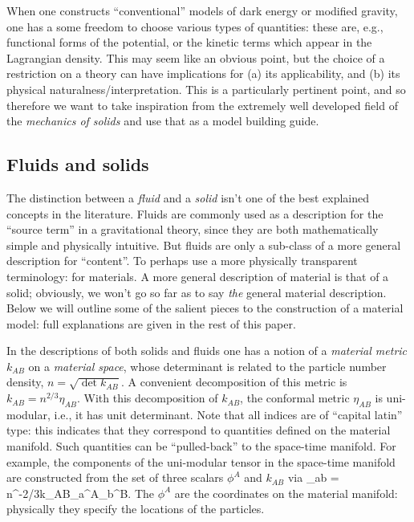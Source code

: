 When one constructs ``conventional'' models of dark energy or modified gravity, one has a some freedom to choose various types of quantities: these are, e.g., functional forms of the potential, or the kinetic terms which appear in the Lagrangian density. This may seem like an obvious point, but the choice of a restriction on a theory can have implications for (a) its applicability, and (b) its physical naturalness/interpretation. This is a particularly pertinent point, and so therefore we want to take inspiration from the extremely well developed field of the \textit{mechanics of solids} and use that as a model building guide.


\subsection{Fluids and solids}
The distinction between a \textit{fluid} and a \textit{solid} isn't one of the best explained concepts in the literature. Fluids are commonly used as a description for the ``source term'' in a gravitational theory, since they are both mathematically simple and physically intuitive. But fluids are only a sub-class of a more general description for ``content''. To perhaps use a  more physically transparent terminology: for materials. A more general  description of material is that of a solid; obviously, we won't go so far as to say \textit{the}  general material description. Below we will outline some of the salient pieces to the construction of a material model: full explanations are given in the rest of this paper.

In the descriptions of both solids and fluids  one has a notion of a \textit{material metric} $k_{AB}$ on a \textit{material space}, whose determinant is related to the particle number density, $n = \sqrt{\det k_{AB}}$. A convenient decomposition of this metric is $k_{AB} = n^{2/3}\eta_{AB}$. With this decomposition of   $k_{AB}$, the conformal metric $\eta_{AB}$ is uni-modular, i.e., it has unit determinant. Note that all indices are of ``capital latin'' type: this indicates that they correspond to quantities defined on the material manifold. Such quantities can be ``pulled-back'' to the space-time manifold. For example, the components of the uni-modular tensor in the space-time manifold are constructed from the set of three scalars $\phi^A$  and $k_{AB}$ via
\bea
\eta_{ab} = n^{-2/3}k_{AB}\partial_a\phi^A\partial_b\phi^B.
\eea
The $\phi^A$ are the coordinates on the material manifold: physically they specify the locations of the particles.

